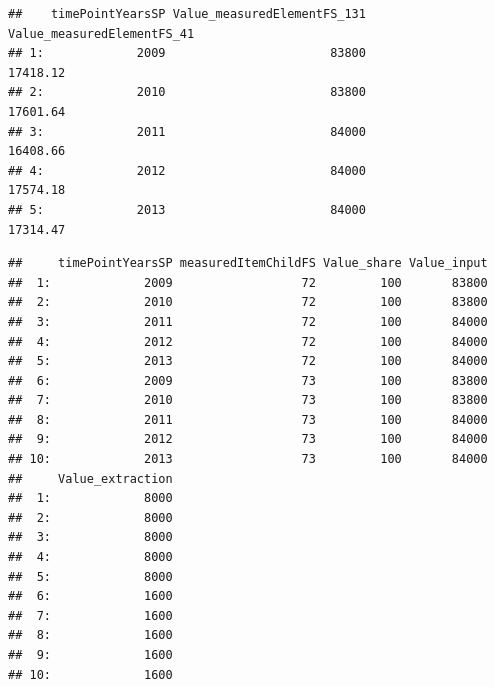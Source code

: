 \documentclass[nojss]{jss}
\begin{document}
\begin{knitrout}
\color{fgcolor}\begin{kframe}
\begin{alltt}
\hlstd{toProcess[,} \hlstd{(}\hlstd{,} \hlstd{,}
              \hlstd{),}  \hlstd{= F]}
\end{alltt}
\begin{verbatim}
##    timePointYearsSP Value_measuredElementFS_131 Value_measuredElementFS_41
## 1:             2009                       83800                   17418.12
## 2:             2010                       83800                   17601.64
## 3:             2011                       84000                   16408.66
## 4:             2012                       84000                   17574.18
## 5:             2013                       84000                   17314.47
\end{verbatim}
\begin{alltt}
\hlstd{edges[,} \hlstd{(}\hlstd{,} \hlstd{,} \hlstd{,}
          \hlstd{,} \hlstd{),}  \hlstd{=} \hlstd{]}
\end{alltt}
\begin{verbatim}
##     timePointYearsSP measuredItemChildFS Value_share Value_input
##  1:             2009                  72         100       83800
##  2:             2010                  72         100       83800
##  3:             2011                  72         100       84000
##  4:             2012                  72         100       84000
##  5:             2013                  72         100       84000
##  6:             2009                  73         100       83800
##  7:             2010                  73         100       83800
##  8:             2011                  73         100       84000
##  9:             2012                  73         100       84000
## 10:             2013                  73         100       84000
##     Value_extraction
##  1:             8000
##  2:             8000
##  3:             8000
##  4:             8000
##  5:             8000
##  6:             1600
##  7:             1600
##  8:             1600
##  9:             1600
## 10:             1600
\end{verbatim}
\begin{alltt}

\end{alltt}
\end{kframe}
\end{knitrout}
\end{document}
